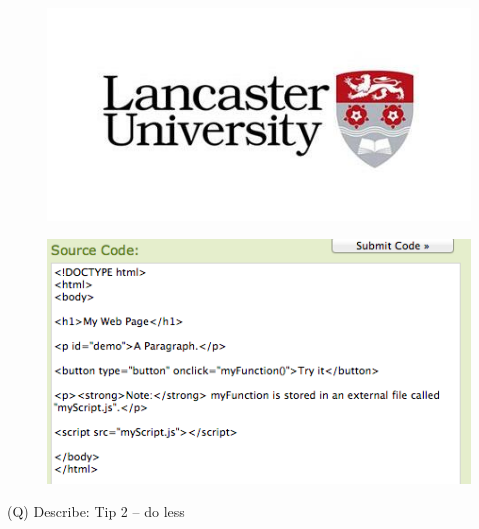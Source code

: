 \documentclass[12pt]{article}
\begin{document}
\begin{figure}[H]
\includegraphics[width=0.5\linewidth]{page48-image-2.png}
\end{figure}
\begin{figure}[H]
\includegraphics[width=0.5\linewidth]{page48-image-3.png}
\end{figure}
\clearpage
(Q)
Describe: Tip 2 – do less
\clearpage
\end{document}
